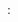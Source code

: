 \begin{changemargin}{-10mm}{-15mm}
\begin{activite}[...]
    \hspace*{-10mm}{\bf Objectifs} : 
 \end{activite}
\end{changemargin}
